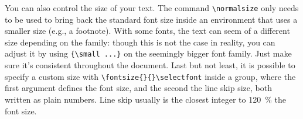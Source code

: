 You can also control the size of your text. The \gls{command} \texttt{\textbackslash{}normalsize} only needs to be used to bring back the standard font size inside an \gls{environment} that uses a smaller size (e.g., a footnote). With some fonts, the text can seem of a different size depending on the family: though this is not the case in reality, you can adjust it by using \texttt{\{\textbackslash{}small~...\}} on the seemingly bigger font family. Just make sure it's consistent throughout the document. Last but not least, it is possible to specify a custom size with \texttt{\textbackslash{}fontsize\{\}\{\}\textbackslash{}selectfont} inside a \gls{group}, where the first \gls{argument} defines the font size, and the second the line skip size, both written as plain numbers. Line skip usually is the closest integer to 120~\% the font size.

\begingroup
    \setlength{\columnA}{\dimexpr .25\linewidth}
    \setlength{\columnB}{\dimexpr \linewidth-\columnA}
    
    \setlength{\columnA}{\columnA-2\tabcolsep-3\vbar/2}
    \setlength{\columnB}{\columnB-2\tabcolsep-3\vbar/2}
    
